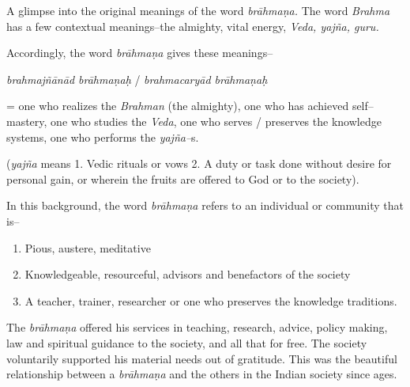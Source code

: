 A glimpse into the original meanings of the word \textit{brāhmaṇa.} The word \textit{Brahma} has a few contextual meanings–the almighty, vital energy, \textit{Veda, yajña, guru.}

Accordingly, the word \textit{brāhmaṇa} gives these meanings–

\textit{brahmajñānād brāhmaṇaḥ} / \textit{brahmacaryād brāhmaṇaḥ}

= one who realizes the \textit{Brahman} (the almighty), one who has achieved self–mastery, one who studies the \textit{Veda}, one who serves / preserves the knowledge systems, one who performs the \textit{yajña–}s.

(\textit{yajña} means 1. Vedic rituals or vows 2. A duty or task done without desire for personal gain, or wherein the fruits are offered to God or to the society). 

In this background, the word \textit{brāhmaṇa} refers to an individual or community that is–

\vspace{-.3cm}

\begin{enumerate}
\itemsep=0pt
\item Pious, austere, meditative 

 \item Knowledgeable, resourceful, advisors and benefactors of the society 

 \item A teacher, trainer, researcher or one who preserves the knowledge traditions.

\end{enumerate}

\vspace{-.3cm}

The \textit{brāhmaṇa} offered his services in teaching, research, advice, policy making, law and spiritual guidance to the society, and all that for free. The society voluntarily supported his material needs out of gratitude. This was the beautiful relationship between a \textit{brāhmaṇa} and the others in the Indian society since ages.

